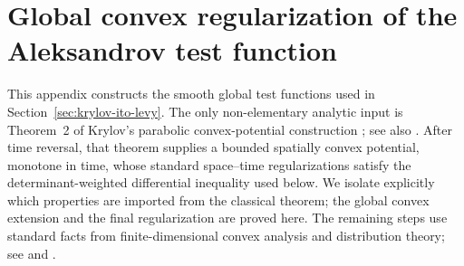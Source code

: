\documentclass[12pt,oneside, reqno]{amsart}
\numberwithin{equation}{section}
\begin{document}
	\appendix
	
	\section{Global convex regularization of the Aleksandrov test function}
	\label{app:aleksandrov-regularization}
	
	This appendix constructs the smooth global test functions used in
	Section~\ref{sec:krylov-ito-levy}. The only non-elementary analytic
	input is Theorem~2 of Krylov's parabolic convex-potential construction
	\cite{Krylov-1976}; see also \cite[Chapter~2]{Krylov-1980}. After
	time reversal, that theorem supplies a bounded spatially convex
	potential, monotone in time, whose standard space--time regularizations
	satisfy the determinant-weighted differential inequality used below.
	We isolate explicitly which properties are imported from the classical
	theorem; the global convex extension and the final regularization are
	proved here. The remaining steps use standard facts from
	finite-dimensional convex analysis and distribution theory; see
	\cite[Sections~10 and~23]{Rockafellar-1970} and
	\cite[Chapter~4]{Hormander-2003}.
	
\end{document}
